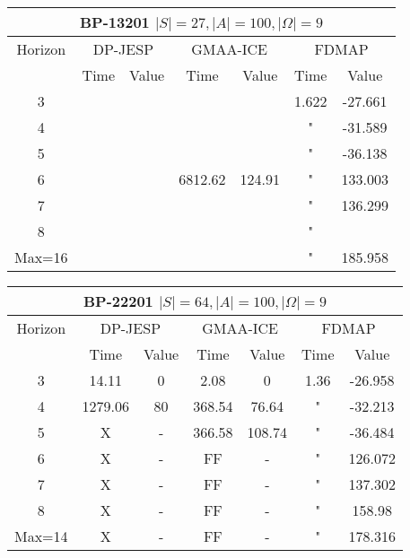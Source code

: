 \documentclass[letterpaper]{article} %
\theoremstyle{definition}
\begin{document}
\begin{center}
    \begin{tabular}{||c|c|c|c|c|c|c||}
         \hline
         \multicolumn{7}{||c||}{BP-13201 $|S|=27, |A|=100, |\Omega|=9$} \\
         \hline
         Horizon & \multicolumn{2}{|c|}{DP-JESP} & \multicolumn{2}{|c|}{GMAA-ICE} & \multicolumn{2}{|c||}{FDMAP}\\ 
         \hline
         & Time & Value & Time & Value & Time & Value \\
         \hline
         3 & & & & & 1.622 & -27.661 \\
         \hline
         4 & & & & & " & -31.589 \\
         \hline
         5 & & & & & " & -36.138 \\ 
         \hline
         6 & & & 6812.62 & 124.91 & " & 133.003 \\
         \hline
         7 & & & & & " & 136.299 \\
         \hline
         8 & & & & & " & \\
         \hline
         Max=16 & & & & & " & 185.958 \\
         \hline
    \end{tabular}
\end{center}

\begin{center}
    \begin{tabular}{||c|c|c|c|c|c|c||}
         \hline
         \multicolumn{7}{||c||}{BP-22201 $|S|=64, |A|=100, |\Omega|=9$} \\
         \hline
         Horizon & \multicolumn{2}{|c|}{DP-JESP} & \multicolumn{2}{|c|}{GMAA-ICE} & \multicolumn{2}{|c||}{FDMAP}\\ 
         \hline
         & Time & Value & Time & Value & Time & Value \\
         \hline
         3 & 14.11 & 0 & 2.08 & 0 & 1.36 & -26.958 \\
         \hline
         4 & 1279.06 & 80 & 368.54 & 76.64 & " & -32.213 \\
         \hline
         5 & X & - & 366.58 & 108.74 & " & -36.484 \\ 
         \hline
         6 & X & - & FF & - & " & 126.072 \\
         \hline
         7 & X & - & FF & - & " & 137.302 \\
         \hline
         8 & X & - & FF & - & " & 158.98 \\
         \hline
         Max=14 & X & - & FF & - & " & 178.316 \\
         \hline
    \end{tabular}
\end{center}
\end{document}
